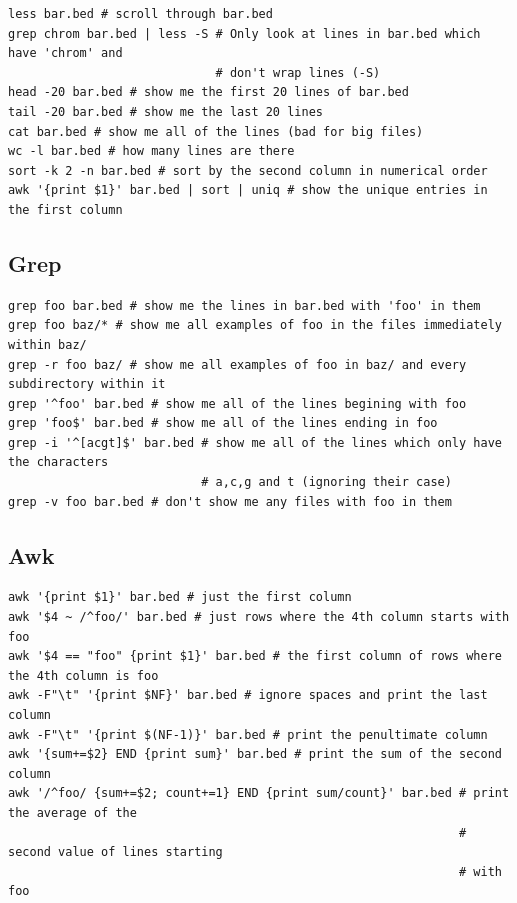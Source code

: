 \documentclass[11pt]{article}
\begin{document}
\begin{verbatim}
less bar.bed # scroll through bar.bed
grep chrom bar.bed | less -S # Only look at lines in bar.bed which have 'chrom' and
                             # don't wrap lines (-S)
head -20 bar.bed # show me the first 20 lines of bar.bed
tail -20 bar.bed # show me the last 20 lines
cat bar.bed # show me all of the lines (bad for big files)
wc -l bar.bed # how many lines are there
sort -k 2 -n bar.bed # sort by the second column in numerical order
awk '{print $1}' bar.bed | sort | uniq # show the unique entries in the first column
\end{verbatim}

\hypertarget{grep}{%
\subsection{Grep}\label{grep}}

\begin{verbatim}
grep foo bar.bed # show me the lines in bar.bed with 'foo' in them
grep foo baz/* # show me all examples of foo in the files immediately within baz/
grep -r foo baz/ # show me all examples of foo in baz/ and every subdirectory within it
grep '^foo' bar.bed # show me all of the lines begining with foo
grep 'foo$' bar.bed # show me all of the lines ending in foo
grep -i '^[acgt]$' bar.bed # show me all of the lines which only have the characters
                           # a,c,g and t (ignoring their case)
grep -v foo bar.bed # don't show me any files with foo in them
\end{verbatim}

\hypertarget{awk}{%
\subsection{Awk}\label{awk}}

\begin{verbatim}
awk '{print $1}' bar.bed # just the first column
awk '$4 ~ /^foo/' bar.bed # just rows where the 4th column starts with foo
awk '$4 == "foo" {print $1}' bar.bed # the first column of rows where the 4th column is foo
awk -F"\t" '{print $NF}' bar.bed # ignore spaces and print the last column
awk -F"\t" '{print $(NF-1)}' bar.bed # print the penultimate column
awk '{sum+=$2} END {print sum}' bar.bed # print the sum of the second column
awk '/^foo/ {sum+=$2; count+=1} END {print sum/count}' bar.bed # print the average of the
                                                               # second value of lines starting
                                                               # with foo
\end{verbatim}
\end{document}
